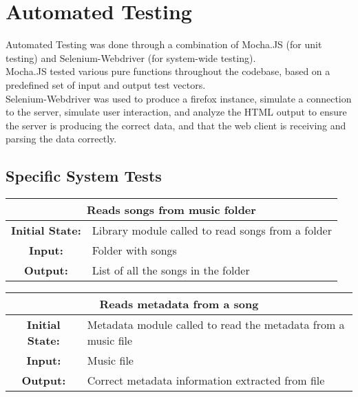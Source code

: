 \documentclass[12pt, titlepage]{article}
\begin{document}
\section{Automated Testing}

Automated Testing was done through a combination of Mocha.JS (for unit testing) and Selenium-Webdriver (for system-wide testing). \\


Mocha.JS tested various pure functions throughout the codebase, based on a predefined set of input and output test vectors. \\

Selenium-Webdriver was used to produce a firefox instance, simulate a connection to the server, simulate user interaction, and analyze the HTML output to ensure the server is producing the correct data, and that the web client is receiving and parsing the data correctly.
        
\subsection{Specific System Tests}


\begin{center}
\begin{table}[H]
\begin{tabularx}{\textwidth}{| c X |}
\hline
\multicolumn{2}{|c|}{\textbf{Reads songs from music folder}}\\
\hline
\textbf{Initial State: } & Library module called to read songs from a folder\\
\textbf{Input: } & Folder with songs\\
\textbf{Output: } & List of all the songs in the folder\\
\hline
\end{tabularx}
\end{table}
\end{center}


\begin{center}
\begin{table}[H]
\begin{tabularx}{\textwidth}{| c X |}
\hline
\multicolumn{2}{|c|}{\textbf{Reads metadata from a song}}\\
\hline
\textbf{Initial State: } & Metadata module called to read the metadata from a music file\\
\textbf{Input: } & Music file\\
\textbf{Output: } & Correct metadata information extracted from file\\
\hline
\end{tabularx}
\end{table}
\end{center}
\end{document}
